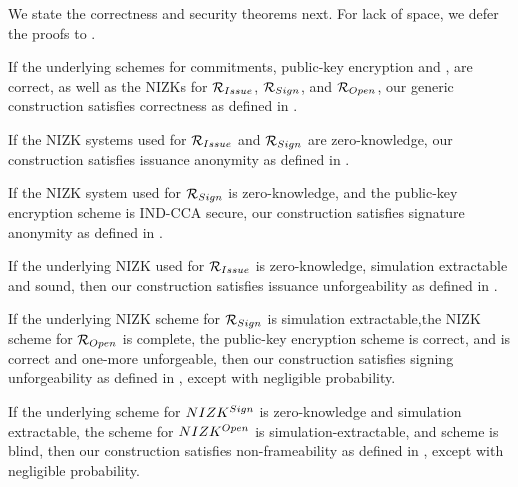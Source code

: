We state the correctness and security theorems next. For lack of space, we defer
the proofs to .

\begin{theorem}
  \label{thm:correctness-uas}
  If the underlying schemes for commitments, public-key encryption and \SBCM,
  are correct, as well as the NIZKs for $\mathcal{R}_{Issue}$, $\mathcal{R}_{Sign}$,
  and $\mathcal{R}_{Open}$, our generic construction \CUASGen satisfies
  correctness as defined in .
\end{theorem}

\begin{theorem}
  \label{thm:issue-anonymity-uas}
  If the NIZK systems used for $\mathcal{R}_{Issue}$ and $\mathcal{R}_{Sign}$ are
  zero-knowledge, our \CUASGen construction satisfies issuance anonymity as
  defined in .
\end{theorem}

\begin{theorem}
  \label{thm:sign-anonymity-uas}
  If the NIZK system used for $\mathcal{R}_{Sign}$ is zero-knowledge, and the
  public-key encryption scheme is IND-CCA secure, our \CUASGen construction
  satisfies signature anonymity as defined in .
\end{theorem}

\begin{theorem}
  \label{thm:issue-forge-uas}
  If the underlying NIZK used for $\mathcal{R}_{Issue}$ is zero-knowledge,
  simulation extractable and sound, then our \CUASGen construction satisfies
  issuance unforgeability as defined in .
\end{theorem}

\begin{theorem}
  \label{thm:sign-forge-uas}
  If the underlying NIZK scheme for $\mathcal{R}_{Sign}$ is simulation
  extractable,the NIZK scheme for $\mathcal{R}_{Open}$ is complete, the public-key
  encryption scheme is correct, and \SBCM is correct and one-more unforgeable,
  then our \CUASGen construction satisfies signing unforgeability as defined in
  , except with negligible probability.
\end{theorem}

\begin{theorem}
  \label{thm:frame-uas}
  If the underlying scheme for $NIZK^{Sign}$ is zero-knowledge and simulation
  extractable, the scheme for $NIZK^{Open}$ is simulation-extractable, and
  \SBCM scheme is blind, then our \CUASGen construction satisfies
  non-frameability as defined in , except with negligible
  probability.
\end{theorem}

